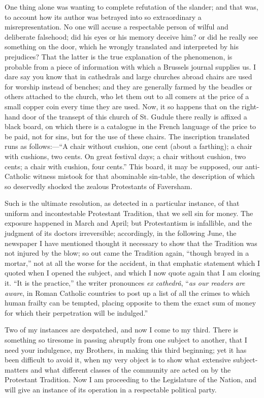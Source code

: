 One thing alone was wanting to complete refutation of
the slander; and that was, to account how its author was
betrayed into so extraordinary a misrepresentation. No
one will accuse a respectable person of wilful and
deliberate falsehood; did his eyes or his memory deceive
him? or did he really see something on the door, which he
wrongly translated and interpreted by his prejudices?
That the latter is the true explanation of the
phenomenon, is probable from a piece of information with
which a Brussels journal supplies us. I dare say you know
that in cathedrals and large churches abroad chairs are
used for worship instead of benches; and they are
generally farmed by the beadles or others attached to the
church, who let them out to all comers at the price of a
small copper coin every time they are used. Now, it so
happens that on the right-hand door of the transept of
this church of St. Gudule there really is affixed a black
board, on which there is a catalogue in the French
language of the price to be paid, not for sins, but for
the use of these chairs. The inscription translated runs
as follows:—``A chair without cushion, one cent
(about a farthing); a chair with cushions, two cents. On
great festival days; a chair without cushion, two cents;
a chair with cushion, four cents.'' This board, it
may be supposed, our anti-Catholic witness mistook for
that abominable sin-table, the description of which so
deservedly shocked the zealous Protestants of Faversham.

Such is the ultimate resolution, as detected in a
particular instance, of that uniform and incontestable
Protestant Tradition, that we sell sin for money. The
exposure happened in March and April; but Protestantism
is infallible, and the judgment of its doctors
irreversible; accordingly, in the following June, the
newspaper I have mentioned thought it necessary to show
that the Tradition was not injured by the blow; so out
came the Tradition again, ``though brayed in a
mortar,'' not at all the worse for the accident, in
that emphatic statement which I quoted when I opened the
subject, and which I now quote again that I am closing
it. ``It is the practice,'' the writer pronounces
\emph{ex cathedrâ}, ``\emph{as our readers are aware},
in Roman Catholic countries to post up a list of all the
crimes to which human frailty can be tempted, placing
opposite to them the exact sum of money for which their
perpetration will be indulged.''

Two of my instances are despatched, and now I come to
my third. There is something so tiresome in passing
abruptly from one subject to another, that I need your
indulgence, my Brothers, in making this third beginning;
yet it has been difficult to avoid it, when my very
object is to show what extensive subject-matters and what
different classes of the community are acted on by the
Protestant Tradition. Now I am proceeding to the
Legislature of the Nation, and will give an instance of
its operation in a respectable political party.

